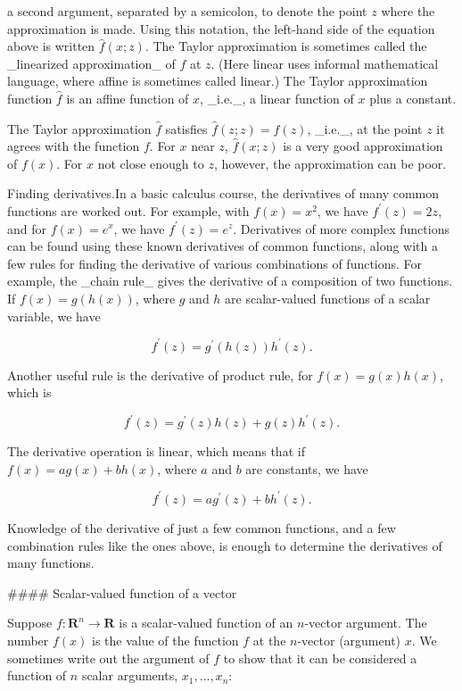 a second argument, separated by a semicolon, to denote the point \(z\) where the approximation is made. Using this notation, the left-hand side of the equation above is written \(\hat{f}(x;z)\). The Taylor approximation is sometimes called the _linearized approximation_ of \(f\) at \(z\). (Here linear uses informal mathematical language, where affine is sometimes called linear.) The Taylor approximation function \(\hat{f}\) is an affine function of \(x\), _i.e._, a linear function of \(x\) plus a constant.

The Taylor approximation \(\hat{f}\) satisfies \(\hat{f}(z;z)=f(z)\), _i.e._, at the point \(z\) it agrees with the function \(f\). For \(x\) near \(z\), \(\hat{f}(x;z)\) is a very good approximation of \(f(x)\). For \(x\) not close enough to \(z\), however, the approximation can be poor.

Finding derivatives.In a basic calculus course, the derivatives of many common functions are worked out. For example, with \(f(x)=x^{2}\), we have \(f^{\prime}(z)=2z\), and for \(f(x)=e^{x}\), we have \(f^{\prime}(z)=e^{z}\). Derivatives of more complex functions can be found using these known derivatives of common functions, along with a few rules for finding the derivative of various combinations of functions. For example, the _chain rule_ gives the derivative of a composition of two functions. If \(f(x)=g(h(x))\), where \(g\) and \(h\) are scalar-valued functions of a scalar variable, we have

\[f^{\prime}(z)=g^{\prime}(h(z))h^{\prime}(z).\]

Another useful rule is the derivative of product rule, for \(f(x)=g(x)h(x)\), which is

\[f^{\prime}(z)=g^{\prime}(z)h(z)+g(z)h^{\prime}(z).\]

The derivative operation is linear, which means that if \(f(x)=ag(x)+bh(x)\), where \(a\) and \(b\) are constants, we have

\[f^{\prime}(z)=ag^{\prime}(z)+bh^{\prime}(z).\]

Knowledge of the derivative of just a few common functions, and a few combination rules like the ones above, is enough to determine the derivatives of many functions.

#### Scalar-valued function of a vector

Suppose \(f:\mathbf{R}^{n}\to\mathbf{R}\) is a scalar-valued function of an \(n\)-vector argument. The number \(f(x)\) is the value of the function \(f\) at the \(n\)-vector (argument) \(x\). We sometimes write out the argument of \(f\) to show that it can be considered a function of \(n\) scalar arguments, \(x_{1},\ldots,x_{n}\):

